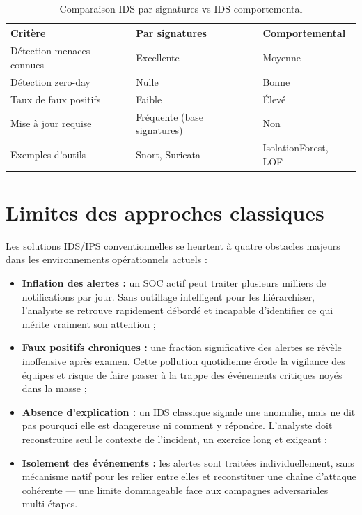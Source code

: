 \documentclass[12pt,a4paper]{report}
\begin{document}
\begin{table}[H]
\centering
\caption{Comparaison IDS par signatures vs IDS comportemental}
\label{tab:ids_comparaison}
\begin{tabular}{|p{4cm}|p{5cm}|p{5cm}|}
\hline
\textbf{Critère} & \textbf{Par signatures} & \textbf{Comportemental} \\
\hline
Détection menaces connues & Excellente & Moyenne \\
\hline
Détection zero-day & Nulle & Bonne \\
\hline
Taux de faux positifs & Faible & Élevé \\
\hline
Mise à jour requise & Fréquente (base signatures) & Non \\
\hline
Exemples d'outils & Snort, Suricata & IsolationForest, LOF \\
\hline
\end{tabular}
\end{table}

\section{Limites des approches classiques}
\begin{onehalfspace}
Les solutions IDS/IPS conventionnelles se heurtent à quatre obstacles majeurs
dans les environnements opérationnels actuels :

\begin{itemize}
  \item[\ding{43}] \textbf{Inflation des alertes :} un SOC actif peut traiter
  plusieurs milliers de notifications par jour. Sans outillage intelligent pour
  les hiérarchiser, l'analyste se retrouve rapidement débordé et incapable
  d'identifier ce qui mérite vraiment son attention ;
  \item[\ding{43}] \textbf{Faux positifs chroniques :} une fraction significative
  des alertes se révèle inoffensive après examen. Cette pollution quotidienne
  érode la vigilance des équipes et risque de faire passer à la trappe des
  événements critiques noyés dans la masse ;
  \item[\ding{43}] \textbf{Absence d'explication :} un IDS classique signale
  une anomalie, mais ne dit pas pourquoi elle est dangereuse ni comment
  y répondre. L'analyste doit reconstruire seul le contexte de l'incident,
  un exercice long et exigeant ;
  \item[\ding{43}] \textbf{Isolement des événements :} les alertes sont traitées
  individuellement, sans mécanisme natif pour les relier entre elles et
  reconstituer une chaîne d'attaque cohérente — une limite dommageable face
  aux campagnes adversariales multi-étapes.
\end{itemize}
\end{onehalfspace}
\end{document}
